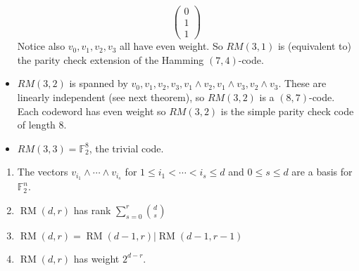 \documentclass{article}
\newcommand{\F}{\mathbb{F}}
\newcommand{\1}[1]{\mathbbm{1}_{#1}}
\DeclareMathOperator{\RM}{RM}
\begin{document}
\begin{eg}
\begin{itemize}
\begin{equation*}
            \begin{pmatrix}0 \\ 1 \\ 1\end{pmatrix}
            \end{equation*}
            Notice also $v_0, v_1, v_2, v_3$ all have even weight. So $RM(3, 1)$ is (equivalent to) the parity check extension of the Hamming $(7, 4)$-code.
        \item $RM(3, 2)$ is spanned by $v_0, v_1, v_2, v_3, v_1 \wedge v_2, v_1 \wedge v_3, v_2 \wedge v_3$.
            These are linearly independent (see next theorem), so $RM(3, 2)$ is a $(8, 7)$-code.
            Each codeword has even weight so $RM(3, 2)$ is the simple parity check code of length $8$.
        \item $RM(3, 3) = \F_2^8$, the trivial code.
    \end{itemize}
\end{eg}
\begin{nthm}\label{thm:2.26}\leavevmode
    \begin{enumerate}[label=(\roman*)]
        \item The vectors $v_{i_1} \wedge \dotsb \wedge v_{i_s}$ for $1 \leq i_1 < \dotsb < i_s \leq d$ and $0 \leq s \leq d$ are a basis for $\F_2^n$.
        \item $\RM(d, r)$ has rank $\sum_{s=0}^r \binom{d}{s}$
        \item $\RM(d, r) = \RM(d-1, r)|\RM(d-1, r-1)$
        \item $\RM(d, r)$ has weight $2^{d-r}$.
    \end{enumerate}
\end{nthm}
\end{document}
